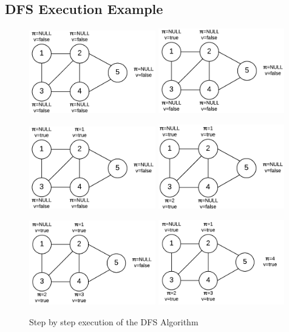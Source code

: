 \documentclass[12pt,letterpaper]{article}
\begin{document}
\subsection{DFS Execution Example}
\begin{figure}[h]
\centering
\includegraphics[width=5.5cm]{dfs0}
\includegraphics[width=5.5cm]{dfs1}

\end{figure}
\begin{figure}[h]
\centering
\includegraphics[width=5.5cm]{dfs2}
\includegraphics[width=5.5cm]{dfs3}

\end{figure}
\begin{figure}[h]
\centering
\includegraphics[width=5.5cm]{dfs4}
\includegraphics[width=5.5cm]{dfs5}
\caption{Step by step execution of the DFS Algorithm}
\end{figure}
\end{document}
